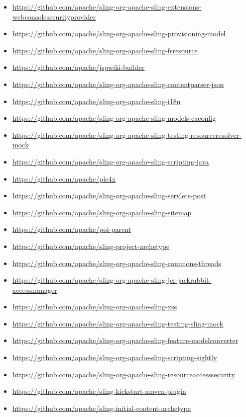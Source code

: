 \documentclass[sigconf]{acmart}
\begin{document}
\begin{itemize}
  \item \url{https://github.com/apache/sling-org-apache-sling-extensions-webconsolesecurityprovider}
  \item \url{https://github.com/apache/sling-org-apache-sling-provisioning-model}
  \item \url{https://github.com/apache/sling-org-apache-sling-fsresource}
  \item \url{https://github.com/apache/jspwiki-builder}
  \item \url{https://github.com/apache/sling-org-apache-sling-contentparser-json}
  \item \url{https://github.com/apache/sling-org-apache-sling-i18n}
  \item \url{https://github.com/apache/sling-org-apache-sling-models-caconfig}
  \item \url{https://github.com/apache/sling-org-apache-sling-testing-resourceresolver-mock}
  \item \url{https://github.com/apache/sling-org-apache-sling-scripting-java}
  \item \url{https://github.com/apache/plc4x}
  \item \url{https://github.com/apache/sling-org-apache-sling-servlets-post}
  \item \url{https://github.com/apache/sling-org-apache-sling-sitemap}
  \item \url{https://github.com/apache/poi-parent}
  \item \url{https://github.com/apache/sling-project-archetype}
  \item \url{https://github.com/apache/sling-org-apache-sling-commons-threads}
  \item \url{https://github.com/apache/sling-org-apache-sling-jcr-jackrabbit-accessmanager}
  \item \url{https://github.com/apache/sling-org-apache-sling-xss}
  \item \url{https://github.com/apache/sling-org-apache-sling-testing-sling-mock}
  \item \url{https://github.com/apache/sling-org-apache-sling-feature-modelconverter}
  \item \url{https://github.com/apache/sling-org-apache-sling-scripting-sightly}
  \item \url{https://github.com/apache/sling-org-apache-sling-resourceaccesssecurity}
  \item \url{https://github.com/apache/sling-kickstart-maven-plugin}
  \item \url{https://github.com/apache/sling-initial-content-archetype}

\end{itemize}
\end{document}
